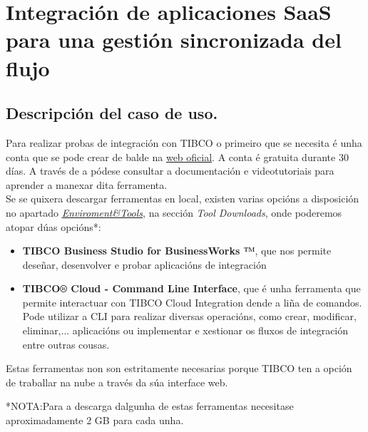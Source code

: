 \chapter{Integración de aplicaciones SaaS para una gestión sincronizada del flujo }
\label{chap:casouso}
\section{Descripción del caso de uso.}
\begin{flushleft}
    Para realizar probas de integración con TIBCO o primeiro que se necesita é unha conta que se pode crear de balde na \href{https://account.cloud.tibco.com/signup/tci}{web oficial}. A conta é gratuita durante 30 días. A través de a pódese consultar a documentación e videotutoriais para aprender a manexar dita ferramenta.\\
    Se se quixera descargar ferramentas en local, existen varias opcións a disposición no apartado \textit{\href{https://eu.integration.cloud.tibco.com/envtools}{Enviroment\&Tools}}, na sección \textit{Tool Downloads}, onde poderemos atopar dúas opcións*: \\
    \begin{itemize}
        \item \textbf{TIBCO Business Studio for BusinessWorks ™}, que nos permite deseñar, desenvolver e probar aplicacións de integración\\
        \item \textbf{TIBCO® Cloud - Command Line Interface}, que é unha ferramenta que permite interactuar con TIBCO Cloud Integration dende a liña de comandos. Pode utilizar a CLI para realizar diversas operacións, como crear, modificar, eliminar,... aplicacións ou implementar e xestionar os fluxos de integración entre outras cousas.\\
    \end{itemize}
    Estas ferramentas non son estritamente necesarias porque TIBCO ten a opción de traballar na nube a través da súa interface web.
    
    *NOTA:Para a descarga dalgunha de estas ferramentas necesitase aproximadamente 2 GB para cada unha.
\end{flushleft}